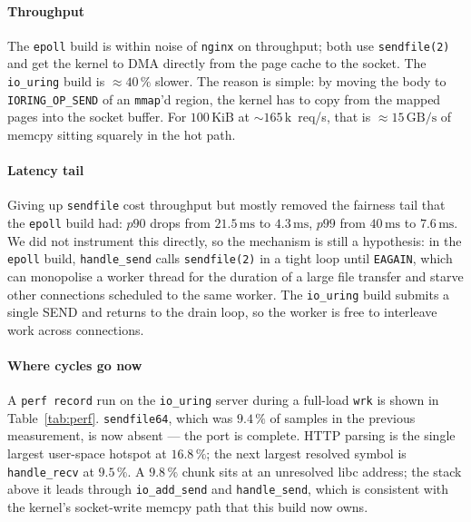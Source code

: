 \documentclass{article}
\begin{document}
\paragraph{Throughput}
The \texttt{epoll} build is within noise of \texttt{nginx} on throughput; both use
\texttt{sendfile(2)} and get the kernel to DMA directly from the page cache to the
socket. The \texttt{io\_uring} build is $\approx 40\,\%$ slower. The reason is simple:
by moving the body to \texttt{IORING\_OP\_SEND} of an \texttt{mmap}'d region, the
kernel has to copy from the mapped pages into the socket buffer. For
$100\,\mathrm{KiB}$ at $\sim 165\,\mathrm{k}$~req/s, that is $\approx 15\,\mathrm{GB/s}$
of memcpy sitting squarely in the hot path.

\paragraph{Latency tail}
Giving up \texttt{sendfile} cost throughput but mostly removed the fairness tail that
the \texttt{epoll} build had: $p90$ drops from $21.5\,\mathrm{ms}$ to $4.3\,\mathrm{ms}$,
$p99$ from $40\,\mathrm{ms}$ to $7.6\,\mathrm{ms}$. We did not instrument this directly,
so the mechanism is still a hypothesis: in the \texttt{epoll} build, \texttt{handle\_send}
calls \texttt{sendfile(2)} in a tight loop until \texttt{EAGAIN}, which can monopolise a
worker thread for the duration of a large file transfer and starve other connections
scheduled to the same worker. The \texttt{io\_uring} build submits a single SEND and
returns to the drain loop, so the worker is free to interleave work across connections.

\paragraph{Where cycles go now}
A \texttt{perf record} run on the \texttt{io\_uring} server during a full-load
\texttt{wrk} is shown in Table~\ref{tab:perf}. \texttt{sendfile64}, which was
$9.4\,\%$ of samples in the previous measurement, is now absent --- the port is
complete. HTTP parsing is the single largest user-space hotspot at $16.8\,\%$;
the next largest resolved symbol is \texttt{handle\_recv} at $9.5\,\%$. A
$9.8\,\%$ chunk sits at an unresolved libc address; the stack above it leads
through \texttt{io\_add\_send} and \texttt{handle\_send}, which is consistent with
the kernel's socket-write memcpy path that this build now owns.
\end{document}
